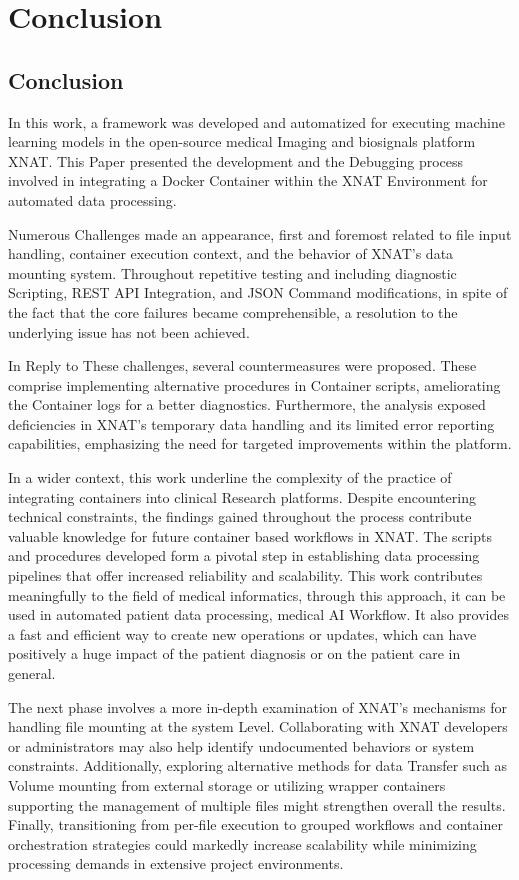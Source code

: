 

\chapter{Conclusion}


\section{Conclusion}
In this work, a framework was developed and automatized for executing machine learning models in the open-source medical Imaging and biosignals platform XNAT. This Paper presented the development and the Debugging process involved in integrating a Docker Container within the XNAT Environment for automated data processing.

Numerous Challenges made an appearance, first and foremost related to file input handling, container execution context, and the behavior of XNAT's data mounting system. Throughout repetitive testing and including diagnostic Scripting, REST API Integration, and JSON Command modifications, in spite of the fact that the core failures became comprehensible, a resolution to the underlying issue has not been achieved.


In Reply to These challenges, several countermeasures were proposed. These comprise implementing alternative procedures in Container scripts, ameliorating the Container logs for a better diagnostics. Furthermore, the analysis exposed deficiencies in XNAT’s temporary data handling and its limited error reporting capabilities, emphasizing the need for targeted improvements within the platform.

In a wider context, this work underline the complexity of the practice of integrating containers into clinical Research platforms.
Despite encountering technical constraints, the findings gained throughout the process
contribute valuable knowledge for future container based workflows in XNAT. The scripts and procedures developed form a pivotal step in establishing data processing pipelines that offer increased reliability and scalability. This work contributes meaningfully to the field of medical informatics, through this approach, it can be used in automated patient data processing, medical AI Workflow. It also provides a fast and efficient way to create new operations or updates, which can have positively a huge impact of the patient diagnosis or on the patient care in general.

The next phase involves a more in-depth examination of XNAT's mechanisms for handling file mounting at the system Level. Collaborating with XNAT developers or administrators may also help identify undocumented behaviors or system constraints. Additionally, exploring alternative methods for data Transfer such as Volume mounting from external storage or utilizing wrapper containers supporting the management of multiple files  might strengthen overall the results. Finally, transitioning from per-file execution to grouped workflows and container orchestration strategies could markedly increase scalability while minimizing processing demands in extensive project environments.


